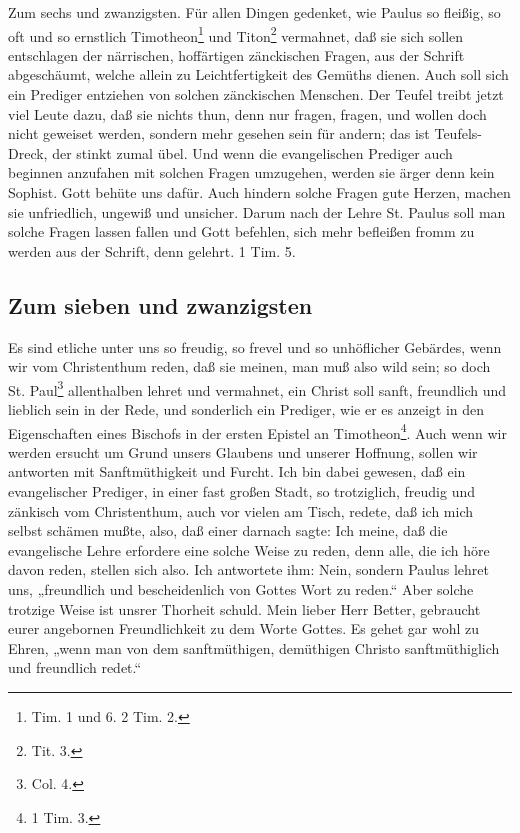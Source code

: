 Zum sechs und zwanzigsten. Für allen Dingen gedenket, wie Paulus so fleißig, so oft und so ernstlich Timotheon\footnote{Tim. 1 und 6. 2 Tim. 2.} und Titon\footnote{Tit. 3.} vermahnet, daß sie sich sollen entschlagen der närrischen, hoffärtigen zänckischen Fragen, aus der Schrift abgeschäumt, welche allein zu Leichtfertigkeit des Gemüths dienen. Auch soll sich ein Prediger entziehen von solchen zänckischen Menschen. Der Teufel treibt jetzt viel Leute dazu, daß sie nichts thun, denn nur fragen, fragen, und wollen doch nicht geweiset werden, sondern mehr gesehen sein für andern; das ist Teufels-Dreck, der stinkt zumal übel. Und wenn die evangelischen Prediger auch beginnen anzufahen mit solchen Fragen umzugehen, werden sie ärger denn kein Sophist. Gott behüte uns dafür. Auch hindern solche Fragen gute Herzen, machen sie unfriedlich, ungewiß und unsicher. Darum nach der Lehre St. Paulus soll man solche Fragen lassen fallen und Gott befehlen, sich mehr befleißen fromm zu werden aus der Schrift, denn gelehrt. 1 Tim. 5.

\subsection{Zum sieben und zwanzigsten}

Es sind etliche unter uns so freudig, so frevel und so unhöflicher Gebärdes, wenn wir vom Christenthum reden, daß sie meinen, man muß also wild sein; so doch St. Paul\footnote{Col. 4.} allenthalben lehret und vermahnet, ein Christ soll sanft, freundlich und lieblich sein in der Rede, und sonderlich ein Prediger, wie er es anzeigt in den Eigenschaften eines Bischofs in der ersten Epistel an Timotheon\footnote{1 Tim. 3.}. Auch wenn wir werden ersucht um Grund unsers Glaubens und unserer Hoffnung, sollen wir antworten mit Sanftmüthigkeit und Furcht. Ich bin dabei gewesen, daß ein evangelischer Prediger, in einer fast großen Stadt, so trotziglich, freudig und zänkisch vom Christenthum, auch vor vielen am Tisch, redete, daß ich mich selbst schämen mußte, also, daß einer darnach sagte: Ich meine, daß die evangelische Lehre erfordere eine solche Weise zu reden, denn alle, die ich höre davon reden, stellen sich also. Ich antwortete ihm: Nein, sondern Paulus lehret uns, „freundlich und bescheidenlich von Gottes Wort zu reden.“ Aber solche trotzige Weise ist unsrer Thorheit schuld. Mein lieber Herr Better, gebraucht eurer angebornen Freundlichkeit zu dem Worte Gottes. Es gehet gar wohl zu Ehren, „wenn man von dem sanftmüthigen, demüthigen Christo sanftmüthiglich und freundlich redet.“

